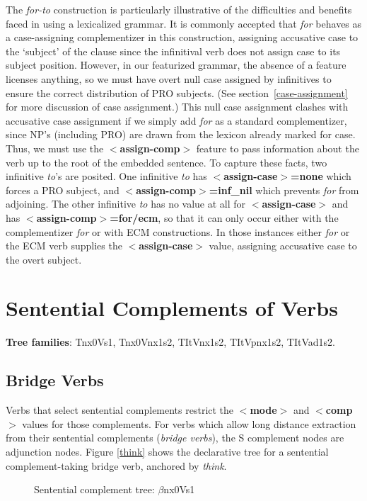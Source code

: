 The {\it for-to\/} construction is particularly illustrative of the
difficulties and benefits faced in using a lexicalized grammar.  It is
commonly accepted that {\it for\/} behaves as a case-assigning
complementizer in this construction, assigning accusative case to the
`subject' of the clause since the infinitival verb does not assign
case to its subject position.  However, in our featurized grammar, the
absence of a feature licenses anything, so we must have overt null
case assigned by infinitives to ensure the correct distribution of PRO
subjects. (See section~\ref{case-assignment} for more discussion of
case assignment.)  This null case assignment clashes with accusative
case assignment if we simply add {\it for\/} as a standard
complementizer, since NP's (including PRO) are drawn from the lexicon
already marked for case.  Thus, we must use the {\bf
$<$assign-comp$>$} feature to pass information about the verb up to
the root of the embedded sentence.  To capture these facts, two
infinitive {\it to}'s are posited. One infinitive {\it to\/} has {\bf
$<$assign-case$>$=none} which forces a PRO subject, and {\bf
$<$assign-comp$>$=inf\_nil} which prevents {\it for\/} from
adjoining. The other infinitive {\it to\/} has no value at all for
{\bf $<$assign-case$>$} and has {\bf $<$assign-comp$>$=for/ecm}, so that
it can only occur either with the complementizer {\it for\/} or with
ECM constructions. In those
instances either {\it for} or the ECM verb
supplies the {\bf $<$assign-case$>$} value, assigning
 accusative case to the overt subject.
 
\section{Sentential Complements of Verbs}
\label{sent-complements}
{\bf Tree families}: Tnx0Vs1, Tnx0Vnx1s2, TItVnx1s2, TItVpnx1s2, TItVad1s2. 

\subsection{Bridge Verbs}
Verbs that select sentential complements restrict the {\bf $<$mode$>$} and {\bf
$<$comp$>$} values for those complements. For verbs which allow long distance
extraction from their sentential complements ({\it bridge verbs}), the S
complement nodes are adjunction nodes. Figure \ref{think} shows the declarative
tree for a sentential complement-taking bridge verb, anchored by {\it think}.

\begin{figure}[hbt]
\centering
\hspace{0.0in}
\caption{Sentential complement tree: $\beta$nx0Vs1}
\label{think}
\label{2;1,10}
\end{figure}


